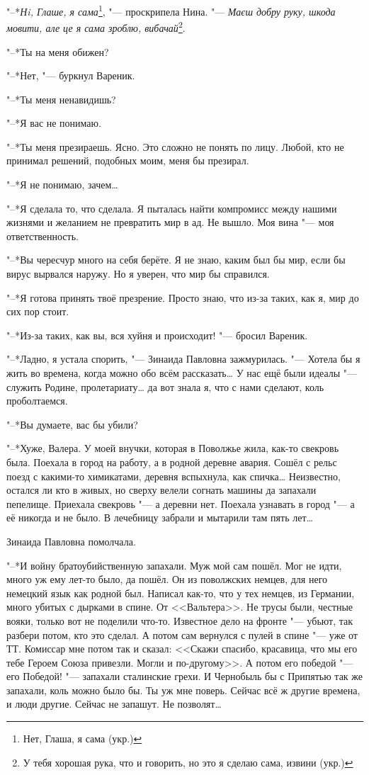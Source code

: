"--*\textit{Нi, Глаше, я сама}\footnote{Нет, Глаша, я сама (укр.)}, "--- проскрипела Нина.
"--- \textit{Маєш добру руку, шкода мовити, але це я сама зроблю, вибачай}\footnote{У тебя хорошая рука, что и говорить, но это я сделаю сама, извини (укр.)}.

\asterism

"--*Ты на меня обижен?

"--*Нет, "--- буркнул Вареник.

"--*Ты меня ненавидишь?

"--*Я вас не понимаю.

"--*Ты меня презираешь.
Ясно.
Это сложно не понять по лицу.
Любой, кто не принимал решений, подобных моим, меня бы презирал.

"--*Я не понимаю, зачем\ldots{}

"--*Я сделала то, что сделала.
Я пыталась найти компромисс между нашими жизнями и желанием не превратить мир в ад.
Не вышло.
Моя вина "--- моя ответственность.

"--*Вы чересчур много на себя берёте.
Я не знаю, каким был бы мир, если бы вирус вырвался наружу.
Но я уверен, что мир бы справился.

"--*Я готова принять твоё презрение.
Просто знаю, что из-за таких, как я, мир до сих пор стоит.

"--*Из-за таких, как вы, вся хуйня и происходит! "--- бросил Вареник.

"--*Ладно, я устала спорить, "--- Зинаида Павловна зажмурилась.
"--- Хотела бы я жить во времена, когда можно обо всём рассказать\ldots{}
У нас ещё были идеалы "--- служить Родине, пролетариату\ldots{} да вот знала я, что с нами сделают, коль проболтаемся.

"--*Вы думаете, вас бы убили?

"--*Хуже, Валера.
У моей внучки, которая в Поволжье жила, как-то свекровь была.
Поехала в город на работу, а в родной деревне авария.
Сошёл с рельс поезд с какими-то химикатами, деревня вспыхнула, как спичка\ldots{}
Неизвестно, остался ли кто в живых, но сверху велели согнать машины да запахали пепелище.
Приехала свекровь "--- а деревни нет.
Поехала узнавать в город "--- а её никогда и не было.
В лечебницу забрали и мытарили там пять лет\ldots{}

Зинаида Павловна помолчала.

"--*И войну братоубийственную запахали.
Муж мой сам пошёл.
Мог не идти, много уж ему лет-то было, да пошёл.
Он из поволжских немцев, для него немецкий язык как родной был.
Написал как-то, что у тех немцев, из Германии, много убитых с дырками в спине.
От <<Вальтера>>.
Не трусы были, честные вояки, только вот не поделили что-то.
Известное дело на фронте "--- убьют, так разбери потом, кто это сделал.
А потом сам вернулся с пулей в спине "--- уже от ТТ.
Комиссар мне потом так и сказал: <<Скажи спасибо, красавица, что мы его тебе Героем Союза привезли.
Могли и по-другому>>.
А потом его победой "--- его Победой! "--- запахали сталинские грехи.
И Чернобыль бы с Припятью так же запахали, коль можно было бы.
Ты уж мне поверь.
Сейчас всё ж другие времена, и люди другие.
Сейчас не запашут.
Не позволят\ldots{}

